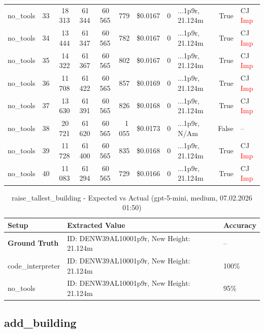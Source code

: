 \documentclass[a4paper,11pt]{article}
\begin{document}
\begin{table}[H]
{\begin{tabular}{l r r r r r r r l r l}
no\_tools & 33 & 18\,313 & 61\,344 & 60\,565 & 779 & \$0.0167 & 0 & ...1p9r, 21.124m & True & CJ \textcolor{red}{Imp} \\
no\_tools & 34 & 13\,444 & 61\,347 & 60\,565 & 782 & \$0.0167 & 0 & ...1p9r, 21.124m & True & CJ \textcolor{red}{Imp} \\
no\_tools & 35 & 14\,322 & 61\,367 & 60\,565 & 802 & \$0.0167 & 0 & ...1p9r, 21.124m & True & CJ \textcolor{red}{Imp} \\
no\_tools & 36 & 11\,708 & 61\,422 & 60\,565 & 857 & \$0.0169 & 0 & ...1p9r, 21.124m & True & CJ \textcolor{red}{Imp} \\
no\_tools & 37 & 13\,630 & 61\,391 & 60\,565 & 826 & \$0.0168 & 0 & ...1p9r, 21.124m & True & CJ \textcolor{red}{Imp} \\
no\_tools & 38 & 20\,721 & 61\,620 & 60\,565 & 1\,055 & \$0.0173 & 0 & ...1p9r, N/Am & False & -- \\
no\_tools & 39 & 11\,728 & 61\,400 & 60\,565 & 835 & \$0.0168 & 0 & ...1p9r, 21.124m & True & CJ \textcolor{red}{Imp} \\
no\_tools & 40 & 11\,083 & 61\,294 & 60\,565 & 729 & \$0.0166 & 0 & ...1p9r, 21.124m & True & CJ \textcolor{red}{Imp} \\
\bottomrule
\end{tabular}}
\end{table}

\begin{table}[H]
\centering
\scriptsize
\caption{raise\_tallest\_building - Expected vs Actual (gpt-5-mini, medium, 07.02.2026 01:50)}
\begin{tabular}{l l l}
\toprule
Setup & Extracted Value & Accuracy \\
\midrule
\textbf{Ground Truth} & ID: DENW39AL10001p9r, New Height: 21.124m & -- \\
\midrule
code\_interpreter & ID: DENW39AL10001p9r, New Height: 21.124m & 100\% \\
no\_tools & ID: DENW39AL10001p9r, New Height: 21.124m & 95\% \\
\bottomrule
\end{tabular}
\end{table}

\clearpage

\subsection{add\_building}
\end{document}
